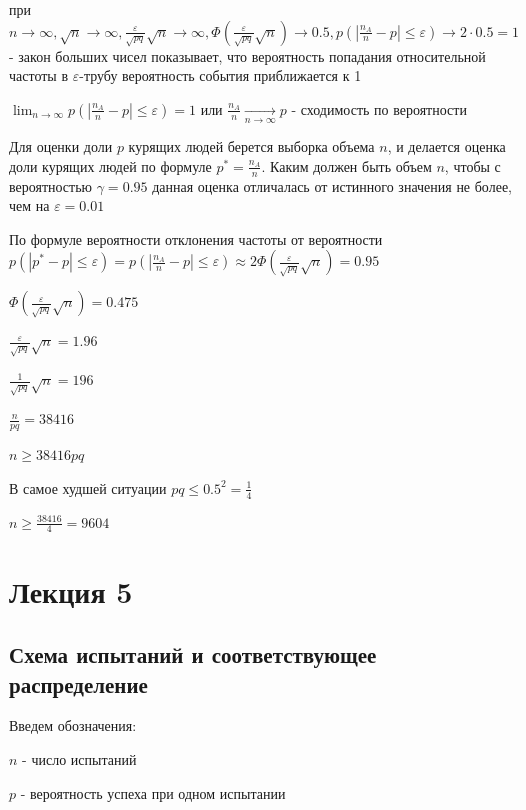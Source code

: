 \documentclass[12pt]{article}
\begin{document}
    при $n \to \infty, \sqrt{n} \to \infty, \frac{\varepsilon}{\sqrt{pq}} \sqrt{n} \to \infty, \Phi\left(\frac{\varepsilon}{\sqrt{pq}}\sqrt{n}\right) \to 0.5, p\left(|\frac{n_A}{n} - p| \leq \varepsilon\right) \to 2 \cdot 0.5 = 1$ - закон больших чисел показывает, что вероятность попадания относительной частоты в $\varepsilon$-трубу вероятность события приближается к 1

    $\lim_{n \to \infty} p\left(|\frac{n_A}{n} - p| \leq \varepsilon\right) = 1$ или $\frac{n_A}{n} \underset{n \to \infty}{\longrightarrow} p$ - сходимость по вероятности

    \Ex Для оценки доли $p$ курящих людей берется выборка объема $n$, и делается оценка доли курящих людей по формуле $p^* = \frac{n_A}{n}$.
    Каким должен быть объем $n$, чтобы с вероятностью $\gamma = 0.95$ данная оценка отличалась от истинного значения не более, чем на $\varepsilon = 0.01$

    По формуле вероятности отклонения частоты от вероятности $p(|p^* - p| \leq \varepsilon) = p\left(|\frac{n_A}{n} - p| \leq \varepsilon\right) \approx 2\Phi\left(\frac{\varepsilon}{\sqrt{pq}}\sqrt{n}\right) = 0.95$

    $\Phi\left(\frac{\varepsilon}{\sqrt{pq}}\sqrt{n}\right) = 0.475$

    $\frac{\varepsilon}{\sqrt{pq}}\sqrt{n} = 1.96$

    $\frac{1}{\sqrt{pq}}\sqrt{n} = 196$

    $\frac{n}{pq} = 38416$

    $n \geq 38416 pq$

    В самое худшей ситуации $pq \leq 0.5^2 = \frac{1}{4}$

    $n \geq \frac{38416}{4} = 9604$


    \section{Лекция 5}

    \subsection{Схема испытаний и соответствующее распределение}

    Введем обозначения:

    $n$ - число испытаний

    $p$ - вероятность успеха при одном испытании
\end{document}
